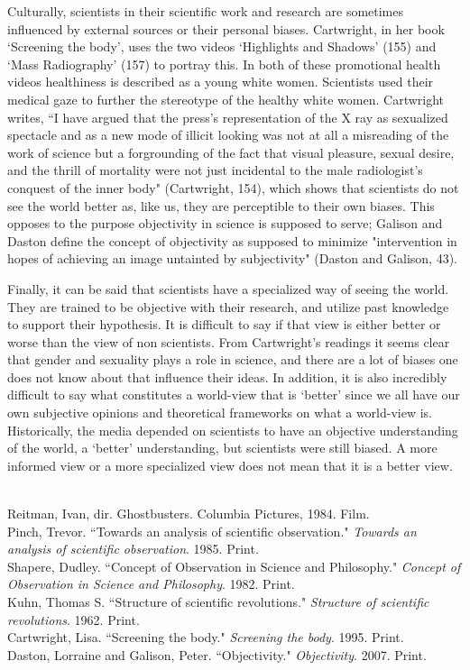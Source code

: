 \documentclass[11pt, oneside]{article}
\begin{document}
\par Culturally, scientists in their scientific work and research are sometimes influenced by external sources or their personal biases. Cartwright, in her book `Screening the body', uses the two videos `Highlights and Shadows' (155) and `Mass Radiography' (157) to portray this. In both of these promotional health videos healthiness is described as a young white women. Scientists used their medical gaze to further the stereotype of the healthy white women. Cartwright writes, ``I have argued that the press's representation of the X ray as sexualized spectacle and as a new mode of illicit looking was not at all a misreading of the work of science but a forgrounding of the fact that visual pleasure, sexual desire, and the thrill of mortality were not just incidental to the male radiologist's conquest of the inner body" (Cartwright, 154), which shows that scientists do not see the world better as, like us, they are perceptible to their own biases. This opposes to the purpose objectivity in science is supposed to serve; Galison and Daston define the concept of objectivity as supposed to minimize "intervention in hopes of achieving an image untainted by subjectivity" (Daston and Galison, 43). 

\par Finally, it can be said that scientists have a specialized way of seeing the world. They are trained to be objective with their research, and utilize past knowledge to support their hypothesis. It is difficult to say if that view is either better or worse than the view of non scientists. From Cartwright's readings it seems clear that gender and sexuality plays a role in science, and there are a lot of biases one does not know about that influence their ideas. In addition, it is also incredibly difficult to say what constitutes a world-view that is `better' since we all have our own subjective opinions and theoretical frameworks on what a world-view is. Historically, the media depended on scientists to have an objective understanding of the world, a `better' understanding, but scientists were still biased. A more informed view or a more specialized view does not mean that it is a better view. 

\begin{workscited}
\bibent \\
\bibent Reitman, Ivan, dir. Ghostbusters. Columbia Pictures, 1984. Film. \\
\bibent Pinch, Trevor. ``Towards an analysis of scientific observation."  \textit{Towards an analysis of scientific observation}.  1985. Print. \\
\bibent Shapere, Dudley. ``Concept of Observation in Science and Philosophy."  \textit{Concept of Observation in Science and Philosophy}.  1982. Print. \\
\bibent Kuhn, Thomas S. ``Structure of scientific revolutions."  \textit{Structure of scientific revolutions}.  1962. Print. \\
\bibent Cartwright, Lisa. ``Screening the body."  \textit{Screening the body}.  1995. Print. \\
\bibent Daston, Lorraine and Galison, Peter. ``Objectivity."  \textit{Objectivity}.  2007. Print. \\
\end{workscited}
\end{document}
